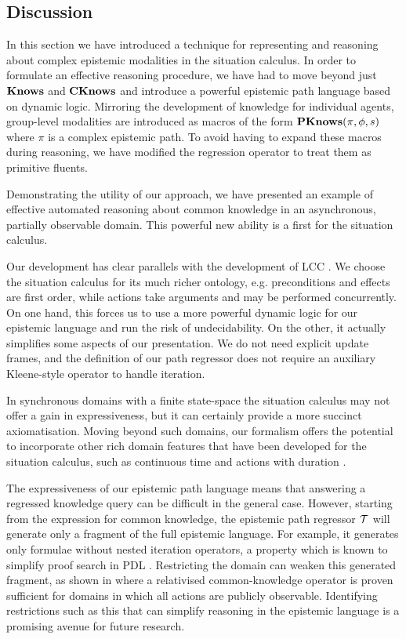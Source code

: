 \subsection{Discussion\label{sub:CEM-Discussion}}

In this section we have introduced a technique for representing and
reasoning about complex epistemic modalities in the situation calculus.
In order to formulate an effective reasoning procedure, we have had
to move beyond just $\mathbf{Knows}$ and $\mathbf{CKnows}$ and introduce a powerful
epistemic path language based on dynamic logic. Mirroring the development
of knowledge for individual agents, group-level modalities are introduced
as macros of the form $\mathbf{PKnows}(\pi,\phi,s)$ where $\pi$ is a complex
epistemic path. To avoid having to expand these macros during reasoning,
we have modified the regression operator to treat them as primitive
fluents.

Demonstrating the utility of our approach, we have presented an example
of effective automated reasoning about common knowledge in an asynchronous,
partially observable domain. This powerful new ability is a first
for the situation calculus.

Our development has clear parallels with the development of LCC \citep{vanBenthem06lcc}.
We choose the situation calculus for its much richer ontology, e.g.
preconditions and effects are first order, while actions take arguments
and may be performed concurrently. On one hand, this forces us to
use a more powerful dynamic logic for our epistemic language and run
the risk of undecidability. On the other, it actually simplifies some
aspects of our presentation. We do not need explicit update frames,
and the definition of our path regressor does not require an auxiliary
Kleene-style operator to handle iteration. 

In synchronous domains with a finite state-space the situation calculus
may not offer a gain in expressiveness, but it can certainly provide
a more succinct axiomatisation. Moving beyond such domains, our formalism
offers the potential to incorporate other rich domain features that
have been developed for the situation calculus, such as continuous
time and actions with duration \citep{reiter96sc_nat_conc}. 

The expressiveness of our epistemic path language means that answering
a regressed knowledge query can be difficult in the general case.
However, starting from the expression for common knowledge, the epistemic
path regressor $\mathcal{T}$ will generate only a fragment of the full epistemic
language. For example, it generates only formulae without nested iteration
operators, a property which is known to simplify proof search in PDL
\citep{abate07twb_pdl}. Restricting the domain can weaken this generated
fragment, as shown in \citep{vanBenthem06lcc} where a relativised
common-knowledge operator is proven sufficient for domains in which
all actions are publicly observable. Identifying restrictions such
as this that can simplify reasoning in the epistemic language is a
promising avenue for future research. 

